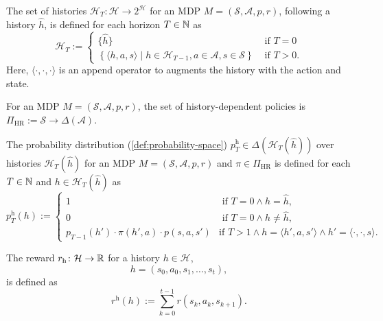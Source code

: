 \begin{definition}[Histories]
  The set of histories $\mathcal{H}_T \colon  \mathcal{H} \to 2^{\mathcal{H}}$ for an MDP $M = (\mathcal{S}, \mathcal{A}, p, r)$, following a history $\hat{h}$, is defined for each horizon $T \in \mathbb{N}$ as
  \[
    \mathcal{H}_T :=
    \begin{cases}
        \{ \hat{h} \} &\text{ if } T = 0 \\      
        \left\{ \langle h, a, s \rangle \mid h \in \mathcal{H}_{T-1}, a\in \mathcal{A}, s\in \mathcal{S} \right\} &\text{ if } T > 0.
    \end{cases}
  \]
  Here, $\langle \cdot , \cdot , \cdot  \rangle$ is an append operator to augments the history with the action and state.
  \leanok
\end{definition}

\begin{definition}
  For an MDP $M = (\mathcal{S}, \mathcal{A}, p, r)$, the set of history-dependent policies is $\Pi_{\mathrm{HR}} := \mathcal{S} \to \Delta(\mathcal{A})$.
  \leanok
\end{definition}

\begin{definition}
  The probability distribution (\cref{def:probability-space}) $p^{\mathrm{h}}_T \in \Delta(\mathcal{H}_T(\hat{h}))$ over histories $\mathcal{H}_T(\hat{h})$ for an MDP $M = (\mathcal{S}, \mathcal{A}, p, r)$ and $\pi \in \Pi_{\mathrm{HR}}$ is defined for each $T \in \mathbb{N}$ and $h\in \mathcal{H}_T(\hat{h})$ as
  \[
    p^{\mathrm{h}}_T(h) :=
    \begin{cases}
      1 & \text{ if } T = 0 \wedge h = \hat{h}, \\
      0 & \text{ if } T = 0 \wedge h \neq  \hat{h}, \\
      p_{T-1}(h') \cdot \pi(h',a) \cdot  p(s, a , s') &\text{if } T > 1 \wedge h = \langle h', a, s' \rangle \wedge h' = \langle \cdot , \cdot , s \rangle.
    \end{cases}
  \]
  \leanok
\end{definition}

\begin{definition}
  The reward $r_{\mathrm{h}}\colon \mathcal{H} \to \mathbb{R}$ for a history $h \in  \mathcal{H}$,
  \[
   h = (s_0, a_0, s_1, \dots , s_t), 
  \]
  is defined as
  \[
   r^{\mathrm{h}}(h) := \sum_{k=0}^{t-1} r(s_k, a_k, s_{k+1}).
 \]
 \leanok
\end{definition}

